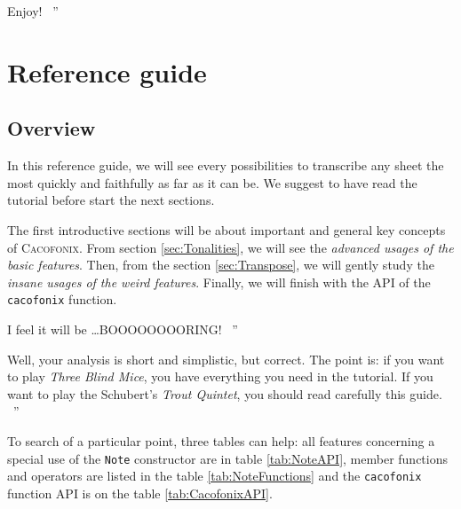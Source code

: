 \documentclass{article}
\newcommand\cacofonix{\textsc{Cacofonix}\xspace}
\newenvironment{meenv}{ \par \noindent \makebox[6em][r]{ \textcolor{mecolor}{Me}: `` --~}}{~''}
\newenvironment{myselfenv}{ \par \noindent \makebox[6em][r]{ \textcolor{myselfcolor}{Myself}: `` --~}}{~''}
\newcommand{ \me }[1]{%
\begin{meenv}%
	#1%
\end{meenv} }
\newcommand{ \myself }[1]{%
\begin{myselfenv}%
	#1%
\end{myselfenv} }
\begin{document}
\myself{Enjoy!}

\section{Reference guide}

\subsection{Overview}

In this reference guide, we will see every possibilities to transcribe any sheet the most quickly and faithfully as far as it can be. We suggest to have read the tutorial before start the next sections.

The first introductive sections will be about important and general key concepts of \cacofonix. From section \ref{sec:Tonalities}, we will see the \emph{advanced usages of the basic features}. Then, from the section \ref{sec:Transpose}, we will gently study the \emph{insane usages of the weird features}. Finally, we will finish with the API of the \lstinline!cacofonix! function.

\me{I feel it will be \dots BOOOOOOOORING!}
\myself{Well, your analysis is short and simplistic, but correct. The point is: if you want to play \emph{Three Blind Mice}, you have everything you need in the tutorial. If you want to play the Schubert's \emph{Trout Quintet}, you should read carefully this guide.}

To search of a particular point, three tables can help: all features concerning a special use of the \lstinline!Note! constructor are in table \ref{tab:NoteAPI}, member functions and operators are listed in the table \ref{tab:NoteFunctions} and the \lstinline!cacofonix! function API is on the table \ref{tab:CacofonixAPI}.
\end{document}
